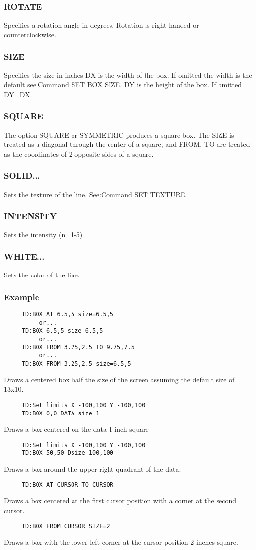 \subsubsection{ROTATE}
Specifies  a  rotation  angle  in degrees.  Rotation is right handed or
counterclockwise.  
\subsubsection{SIZE}
Specifies  the  size  in inches DX is the width of the box.  If omitted
the width is the default see:Command SET BOX SIZE.  DY is the height of
the box.  If omitted DY=DX.  
\subsubsection{SQUARE}
The  option  SQUARE  or  SYMMETRIC  produces a square box.  The SIZE is
treated as a diagonal through the center of a square, and FROM, TO  are
treated as the coordinates of 2 opposite sides of a square.  
\subsubsection{SOLID...}
Sets the texture of the line.  See:Command SET TEXTURE.  
\subsubsection{INTENSITY}
Sets the intensity (n=1-5) 
\subsubsection{WHITE...}
Sets the color of the line.  
\subsubsection{Example}
\begin{verbatim}
     TD:BOX AT 6.5,5 size=6.5,5 
          or...  
     TD:BOX 6.5,5 size 6.5,5 
          or...  
     TD:BOX FROM 3.25,2.5 TO 9.75,7.5 
          or...  
     TD:BOX FROM 3.25,2.5 size=6.5,5 
\end{verbatim}
Draws  a  centered box half the size of the screen assuming the default
size of 13x10.  
\begin{verbatim}
     TD:Set limits X -100,100 Y -100,100 
     TD:BOX 0,0 DATA size 1 
\end{verbatim}
Draws a box centered on the data 1 inch square 
\begin{verbatim}
     TD:Set limits X -100,100 Y -100,100 
     TD:BOX 50,50 Dsize 100,100 
\end{verbatim}
Draws a box around the upper right quadrant of the data.  
\begin{verbatim}
     TD:BOX AT CURSOR TO CURSOR 
\end{verbatim}
Draws  a box centered at the first cursor position with a corner at the
second cursor.  
\begin{verbatim}
     TD:BOX FROM CURSOR SIZE=2 
\end{verbatim}
Draws  a box with the lower left corner at the cursor position 2 inches
square.  
